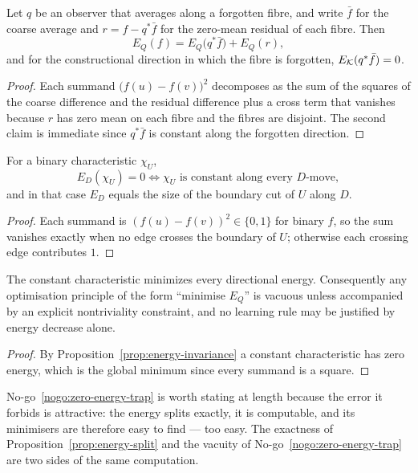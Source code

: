 \begin{proposition}\label{prop:energy-split}
Let $q$ be an observer that averages along a forgotten fibre, and write
$\bar f$ for the coarse average and $r=f-q^{\ast}\bar f$ for the zero-mean residual of
each fibre.  Then
\[
  E_Q(f)=E_Q\bigl(q^{\ast}\bar f\bigr)+E_Q(r),
\]
and for the constructional direction in which the fibre is forgotten,
$E_{\mathcal K}(q^{\ast}\bar f)=0$.
\end{proposition}

\begin{proof}
Each summand $\bigl(f(u)-f(v)\bigr)^{2}$ decomposes as the sum of the squares of the
coarse difference and the residual difference plus a cross term that vanishes because $r$
has zero mean on each fibre and the fibres are disjoint.  The second claim is immediate
since $q^{\ast}\bar f$ is constant along the forgotten direction.
\end{proof}

\begin{proposition}\label{prop:energy-invariance}
For a binary characteristic $\chi_U$,
\[
  E_D(\chi_U)=0 \iff \chi_U \text{ is constant along every } D\text{-move},
\]
and in that case $E_D$ equals the size of the boundary cut of $U$ along $D$.
\end{proposition}

\begin{proof}
Each summand is $(f(u)-f(v))^{2}\in\{0,1\}$ for binary $f$, so the sum vanishes exactly
when no edge crosses the boundary of $U$; otherwise each crossing edge contributes $1$.
\end{proof}

\begin{nogo}\label{nogo:zero-energy-trap}
The constant characteristic minimizes every directional energy.  Consequently any
optimisation principle of the form ``minimise $E_Q$'' is vacuous unless accompanied by an
explicit nontriviality constraint, and no learning rule may be justified by energy
decrease alone.
\end{nogo}

\begin{proof}
By Proposition~\ref{prop:energy-invariance} a constant characteristic has zero energy,
which is the global minimum since every summand is a square.
\end{proof}

\begin{remark}
No-go~\ref{nogo:zero-energy-trap} is worth stating at length because the error it forbids
is attractive: the energy splits exactly, it is computable, and its minimisers are
therefore easy to find --- too easy.  The exactness of
Proposition~\ref{prop:energy-split} and the vacuity of
No-go~\ref{nogo:zero-energy-trap} are two sides of the same computation.
\end{remark}

